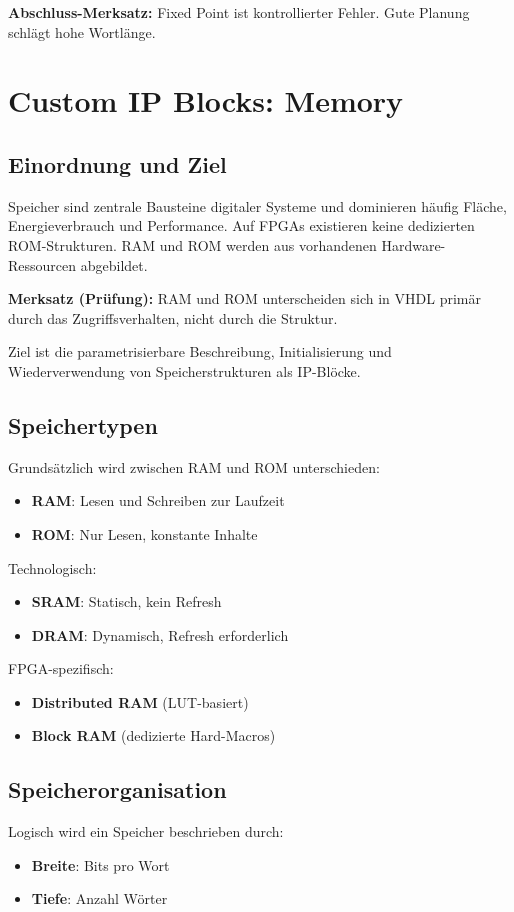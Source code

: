 \documentclass[11pt,a4paper]{article}
\newcommand{\hilite}[1]{\colorbox{yellow!25}{#1}}
\newcommand{\imp}[1]{\textbf{\textcolor{codeemph}{#1}}}
\begin{document}
\imp{Abschluss-Merksatz:}  
\hilite{Fixed Point} ist \hilite{kontrollierter} Fehler. Gute Planung schlägt hohe \hilite{Wortlänge}.


\section{Custom IP Blocks: Memory}

\subsection{Einordnung und Ziel}
Speicher sind zentrale Bausteine digitaler Systeme und dominieren häufig Fläche, Energieverbrauch und Performance.  
Auf FPGAs existieren keine dedizierten ROM-Strukturen. RAM und ROM werden aus vorhandenen Hardware-Ressourcen abgebildet.

\imp{Merksatz (Prüfung):}  
\hilite{RAM} und \hilite{ROM} \hilite{unterscheiden} sich in VHDL primär durch das Zugriffsverhalten, nicht durch die Struktur.

Ziel ist die parametrisierbare Beschreibung, Initialisierung und Wiederverwendung von Speicherstrukturen als IP-Blöcke.

\subsection{Speichertypen}
Grundsätzlich wird zwischen RAM und ROM unterschieden:
\begin{itemize}
  \item \textbf{RAM}: Lesen und Schreiben zur Laufzeit
  \item \textbf{ROM}: Nur Lesen, konstante Inhalte
\end{itemize}

Technologisch:
\begin{itemize}
  \item \textbf{SRAM}: Statisch, kein Refresh
  \item \textbf{DRAM}: Dynamisch, Refresh erforderlich
\end{itemize}

FPGA-spezifisch:
\begin{itemize}
  \item \textbf{Distributed RAM} (LUT-basiert)
  \item \textbf{Block RAM} (dedizierte Hard-Macros)
\end{itemize}

\subsection{Speicherorganisation}
Logisch wird ein Speicher beschrieben durch:
\begin{itemize}
  \item \textbf{Breite}: Bits pro Wort
  \item \textbf{Tiefe}: Anzahl Wörter
\end{itemize}
\end{document}
